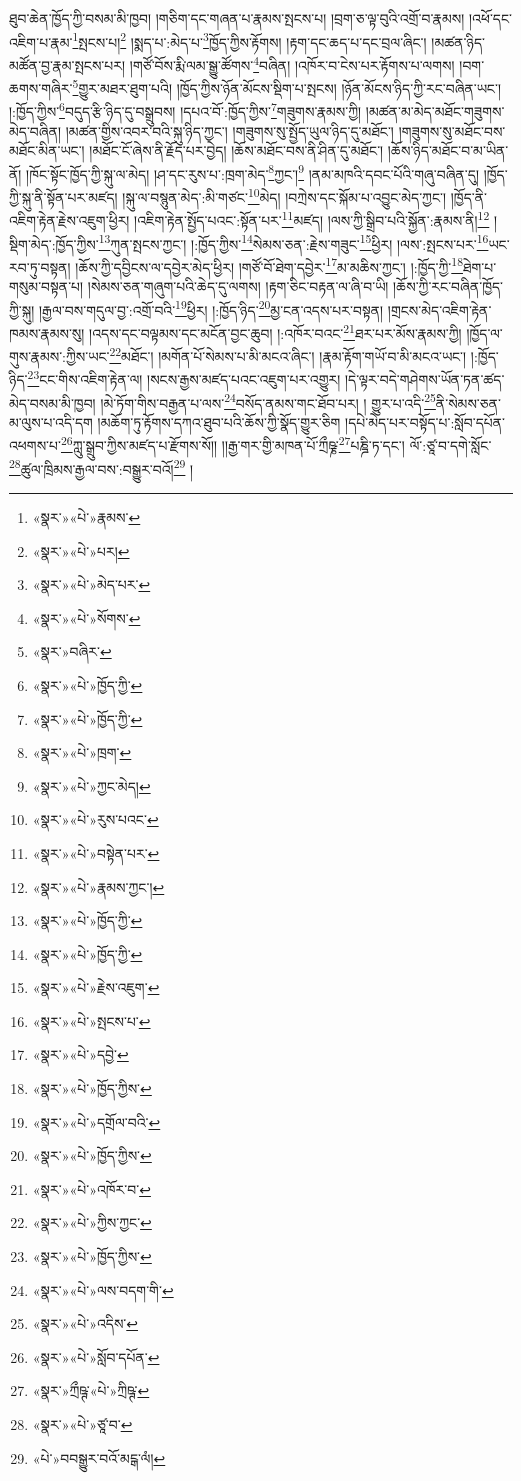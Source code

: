ཐུབ་ཆེན་ཁྱོད་ཀྱི་བསམ་མི་ཁྱབ། །གཅིག་དང་གཞན་པ་རྣམས་སྤངས་པ། །བྲག་ཅ་ལྟ་བུའི་འགྲོ་བ་རྣམས། །འཕོ་དང་འཇིག་པ་རྣམ་\footnote{«སྣར་»«པེ་»རྣམས་}སྤངས་པ།\footnote{«སྣར་»«པེ་»པར།} །སྨད་པ་:མེད་པ་\footnote{«སྣར་»«པེ་»མེད་པར་}ཁྱོད་ཀྱིས་རྟོགས། །རྟག་དང་ཆད་པ་དང་བྲལ་ཞིང་། །མཚན་ཉིད་མཚོན་བྱ་རྣམ་སྤངས་པར། །གཙོ་བོས་རྨི་ལམ་སྒྱུ་ཚོགས་\footnote{«སྣར་»«པེ་»སོགས་}བཞིན། །འཁོར་བ་ངེས་པར་རྟོགས་པ་ལགས། །བག་ཆགས་གཞིར་\footnote{«སྣར་»བཞིར་}གྱུར་མཐར་ཐུག་པའི། །ཁྱོད་ཀྱིས་ཉོན་མོངས་སྡིག་པ་སྤངས། །ཉོན་མོངས་ཉིད་ཀྱི་རང་བཞིན་ཡང་། །:ཁྱོད་ཀྱིས་\footnote{«སྣར་»«པེ་»ཁྱོད་ཀྱི་}བདུད་རྩི་ཉིད་དུ་བསྒྲུབས། །དཔའ་བོ་:ཁྱོད་ཀྱིས་\footnote{«སྣར་»«པེ་»ཁྱོད་ཀྱི་}གཟུགས་རྣམས་ཀྱི། །མཚན་མ་མེད་མཐོང་གཟུགས་མེད་བཞིན། །མཚན་གྱིས་འབར་བའི་སྐུ་ཉིད་ཀྱང་། །གཟུགས་སུ་སྤྱོད་ཡུལ་ཉིད་དུ་མཐོང་། །གཟུགས་སུ་མཐོང་བས་མཐོང་མིན་ཡང་། །མཐོང་ངོ་ཞེས་ནི་རྗོད་པར་བྱེད། །ཆོས་མཐོང་བས་ནི་ཤིན་དུ་མཐོང་། །ཆོས་ཉིད་མཐོང་བ་མ་ཡིན་ནོ། །ཁོང་སྟོང་ཁྱོད་ཀྱི་སྐུ་ལ་མེད། །ཤ་དང་རུས་པ་:ཁྲག་མེད་\footnote{«སྣར་»«པེ་»ཁྲག་}ཀྱང་།\footnote{«སྣར་»«པེ་»ཀྱང་མེད།} །ནམ་མཁའི་དབང་པོའི་གཞུ་བཞིན་དུ། །ཁྱོད་ཀྱི་སྐུ་ནི་སྟོན་པར་མཛད། །སྐུ་ལ་བསྙུན་མེད་:མི་གཙང་\footnote{«སྣར་»«པེ་»རུས་པའང་}མེད། །བཀྲེས་དང་སྐོམ་པ་འབྱུང་མེད་ཀྱང་། །ཁྱོད་ནི་འཇིག་རྟེན་རྗེས་འཇུག་ཕྱིར། །འཇིག་རྟེན་སྤྱོད་པའང་:སྟོན་པར་\footnote{«སྣར་»«པེ་»བསྟེན་པར་}མཛད། །ལས་ཀྱི་སྒྲིབ་པའི་སྐྱོན་:རྣམས་ནི།\footnote{«སྣར་»«པེ་»རྣམས་ཀྱང་།} །སྡིག་མེད་:ཁྱོད་ཀྱིས་\footnote{«སྣར་»«པེ་»ཁྱོད་ཀྱི་}ཀུན་སྤངས་ཀྱང་། །:ཁྱོད་ཀྱིས་\footnote{«སྣར་»«པེ་»ཁྱོད་ཀྱི་}སེམས་ཅན་:རྗེས་གཟུང་\footnote{«སྣར་»«པེ་»རྗེས་འཇུག་}ཕྱིར། །ལས་:སྤངས་པར་\footnote{«སྣར་»«པེ་»སྤངས་པ་}ཡང་རབ་ཏུ་བསྟན། །ཆོས་ཀྱི་དབྱིངས་ལ་དབྱེར་མེད་ཕྱིར། །གཙོ་བོ་ཐེག་དབྱེར་\footnote{«སྣར་»«པེ་»དབྱེ་}མ་མཆིས་ཀྱང་། །:ཁྱོད་ཀྱི་\footnote{«སྣར་»«པེ་»ཁྱོད་ཀྱིས་}ཐེག་པ་གསུམ་བསྟན་པ། །སེམས་ཅན་གཞུག་པའི་ཆེད་དུ་ལགས། །རྟག་ཅིང་བརྟན་ལ་ཞི་བ་ཡི། །ཆོས་ཀྱི་རང་བཞིན་ཁྱོད་ཀྱི་སྐུ། །རྒྱལ་བས་གདུལ་བྱ་:འགྲོ་བའི་\footnote{«སྣར་»«པེ་»དགྲོལ་བའི་}ཕྱིར། །:ཁྱོད་ཉིད་\footnote{«སྣར་»«པེ་»ཁྱོད་ཀྱིས་}མྱ་ངན་འདས་པར་བསྟན། །གྲངས་མེད་འཇིག་རྟེན་ཁམས་རྣམས་སུ། །འདས་དང་བལྟམས་དང་མངོན་བྱང་ཆུབ། །:འཁོར་བའང་\footnote{«སྣར་»«པེ་»འཁོར་བ་}ཐར་པར་མོས་རྣམས་ཀྱི། །ཁྱོད་ལ་གུས་རྣམས་:ཀྱིས་ཡང་\footnote{«སྣར་»«པེ་»ཀྱིས་ཀྱང་}མཐོང་། །མགོན་པོ་སེམས་པ་མི་མངའ་ཞིང་། །རྣམ་རྟོག་གཡོ་བ་མི་མངའ་ཡང་། །:ཁྱོད་ཉིད་\footnote{«སྣར་»«པེ་»ཁྱོད་ཀྱིས་}ངང་གིས་འཇིག་རྟེན་ལ། །སངས་རྒྱས་མཛད་པའང་འཇུག་པར་འགྱུར། །དེ་ལྟར་བདེ་གཤེགས་ཡོན་ཏན་ཚད་མེད་བསམ་མི་ཁྱབ། །མེ་ཏོག་གིས་བརྒྱན་པ་ལས་\footnote{«སྣར་»«པེ་»ལས་བདག་གི་}བསོད་ནམས་གང་ཐོབ་པར། །
གྱུར་པ་འདི་\footnote{«སྣར་»«པེ་»འདིས་}ནི་སེམས་ཅན་མ་ལུས་པ་འདི་དག །མཆོག་ཏུ་རྟོགས་དཀའ་ཐུབ་པའི་ཆོས་ཀྱི་སྣོད་གྱུར་ཅིག །དཔེ་མེད་པར་བསྟོད་པ་:སློབ་དཔོན་འཕགས་པ་\footnote{«སྣར་»«པེ་»སློབ་དཔོན་}ཀླུ་སྒྲུབ་ཀྱིས་མཛད་པ་རྫོགས་སོ།། །།རྒྱ་གར་གྱི་མཁན་པོ་ཀྲྀཥྞ་\footnote{«སྣར་»ཀྲྀཥྚ་«པེ་»ཀྲིཥྚ་}པཎྜི་ཏ་དང་། ལོ་:ཙཱ་བ་དགེ་སློང་\footnote{«སྣར་»«པེ་»ཙཱ་བ་}ཚུལ་ཁྲིམས་རྒྱལ་བས་:བསྒྱུར་བའོ།\footnote{«པེ་»བབསྒྱུར་བའོ་མངྒ་ལཾ།} ། 